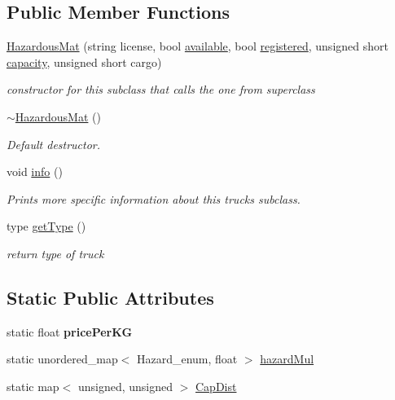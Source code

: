 \subsection*{Public Member Functions}
\begin{DoxyCompactItemize}
\item 
\hyperlink{class_hazardous_mat_adff1b06ba4631c6b3f77168e4b792b1f}{Hazardous\+Mat} (string license, bool \hyperlink{class_truck_a4189fe5ed32f6084459a9c5ae1eb7c2a}{available}, bool \hyperlink{class_truck_a80b8405cf7a15b236fef70116f99c4fb}{registered}, unsigned short \hyperlink{class_truck_ab004524786ae7aebf7c7bdb5e1599696}{capacity}, unsigned short cargo)
\begin{DoxyCompactList}\small\item\em constructor for this subclass that calls the one from superclass \end{DoxyCompactList}\item 
\hyperlink{class_hazardous_mat_aa4304419b08381d4aa46d240ca44738a}{$\sim$\+Hazardous\+Mat} ()
\begin{DoxyCompactList}\small\item\em Default destructor. \end{DoxyCompactList}\item 
void \hyperlink{class_hazardous_mat_ab07463da3e9a5d3b8933d2b01332ed00}{info} ()
\begin{DoxyCompactList}\small\item\em Prints more specific information about this truck\textquotesingle{}s subclass. \end{DoxyCompactList}\item 
type \hyperlink{class_hazardous_mat_aed587121cdff185be91ad9ec5ba4d380}{get\+Type} ()
\begin{DoxyCompactList}\small\item\em return type of truck \end{DoxyCompactList}\end{DoxyCompactItemize}
\subsection*{Static Public Attributes}
\begin{DoxyCompactItemize}
\item 
\mbox{\label{class_hazardous_mat_a9f71519edca3e72082720686781c34dc}} 
static float {\bfseries price\+Per\+KG}
\item 
static unordered\+\_\+map$<$ Hazard\+\_\+enum, float $>$ \hyperlink{class_hazardous_mat_a0d695364bed729ddeca5851314281ad2}{hazard\+Mul}
\item 
static map$<$ unsigned, unsigned $>$ \hyperlink{class_hazardous_mat_a5deebb5a87aa507f2a22065039a3dc2d}{Cap\+Dist}
\end{DoxyCompactItemize}
